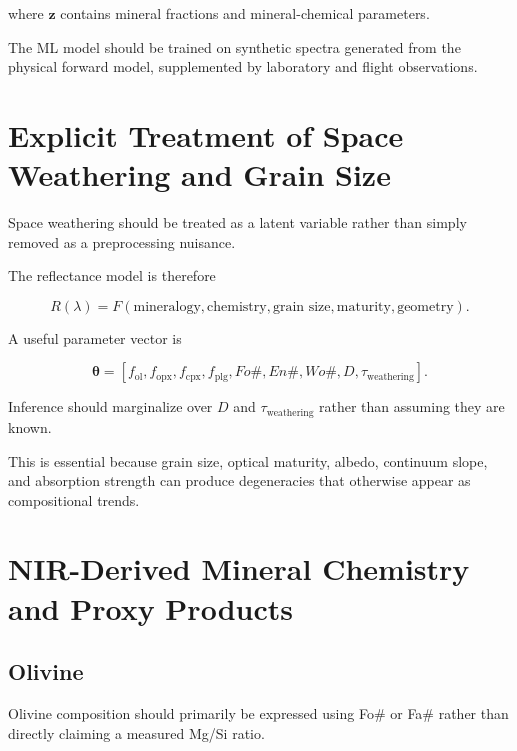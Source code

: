 \documentclass[11pt,a4paper]{article}
\begin{document}
where $\mathbf{z}$ contains mineral fractions and mineral-chemical parameters.

The ML model should be trained on synthetic spectra generated from the physical forward model, supplemented by laboratory and flight observations.

\section{Explicit Treatment of Space Weathering and Grain Size}

Space weathering should be treated as a latent variable rather than simply removed as a preprocessing nuisance.

The reflectance model is therefore

\begin{equation}
R(\lambda)
=
F
\left(
\text{mineralogy},
\text{chemistry},
\text{grain size},
\text{maturity},
\text{geometry}
\right).
\end{equation}

A useful parameter vector is

\begin{equation}
\boldsymbol{\theta}
=
\left[
f_{\mathrm{ol}},
f_{\mathrm{opx}},
f_{\mathrm{cpx}},
f_{\mathrm{plg}},
Fo\#,
En\#,
Wo\#,
D,
\tau_{\mathrm{weathering}}
\right].
\end{equation}

Inference should marginalize over $D$ and $\tau_{\mathrm{weathering}}$ rather than assuming they are known.

This is essential because grain size, optical maturity, albedo, continuum slope, and absorption strength can produce degeneracies that otherwise appear as compositional trends.

\section{NIR-Derived Mineral Chemistry and Proxy Products}

\subsection{Olivine}

Olivine composition should primarily be expressed using Fo\# or Fa\# rather than directly claiming a measured Mg/Si ratio.
\end{document}
